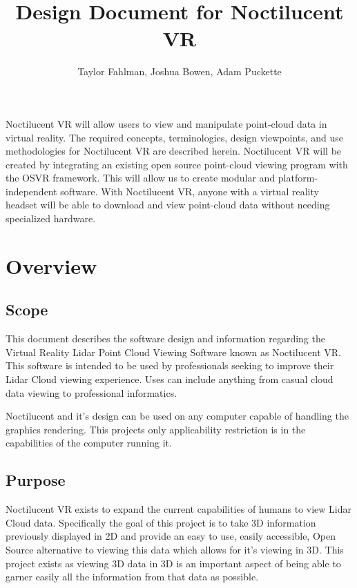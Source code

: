 \documentclass{article}
\begin{document}
\title {Design Document for Noctilucent VR}
\author {Taylor Fahlman, Joshua Bowen, Adam Puckette}

\maketitle

\abstract

Noctilucent VR will allow users to view and manipulate point-cloud data in virtual reality. 
The required concepts, terminologies, design viewpoints, and use methodologies for Noctilucent VR are described herein. 
Noctilucent VR will be created by integrating an existing open source point-cloud viewing program with the OSVR framework. 
This will allow us to create modular and platform-independent software. 
With Noctilucent VR, anyone with a virtual reality headset will be able to download and view point-cloud data without needing specialized hardware.

\newpage
\thispagestyle{empty}

\tableofcontents

\newpage
\thispagestyle{empty}
\mbox{}

\section{Overview}
\subsection{Scope}

This document describes the software design and information regarding the Virtual Reality Lidar Point Cloud Viewing Software known as Noctilucent VR.
This software is intended to be used by professionals seeking to improve their Lidar Cloud viewing experience.
Uses can include anything from casual cloud data viewing to professional informatics.

Noctilucent and it's design can be used on any computer capable of handling the graphics rendering.
This projects only applicability restriction is in the capabilities of the computer running it.

\subsection{Purpose}

Noctilucent VR exists to expand the current capabilities of humans to view Lidar Cloud data.
Specifically the goal of this project is to take 3D information previously displayed in 2D and provide an easy to use, easily accessible, Open Source alternative to viewing this data which allows for it's viewing in 3D.
This project exists as viewing 3D data in 3D is an important aspect of being able to garner easily all the information from that data as possible.
\end{document}
